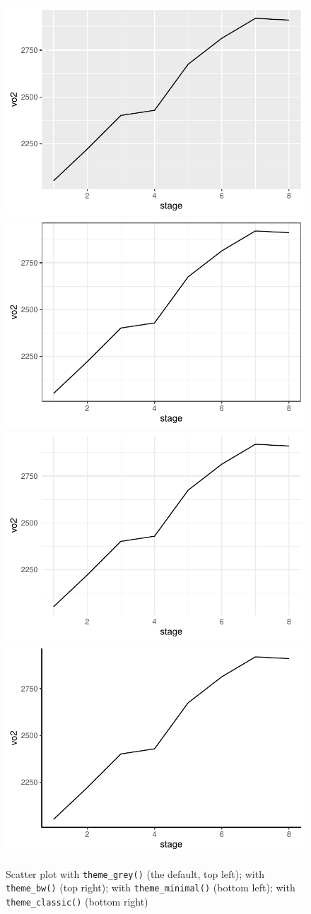 \documentclass[
]{book}
\begin{document}
\begin{figure}

{\centering \includegraphics[width=0.5\linewidth]{se201_stats_book_files/figure-latex/FIG-APPEARANCE-THEME-1} \includegraphics[width=0.5\linewidth]{se201_stats_book_files/figure-latex/FIG-APPEARANCE-THEME-2} \includegraphics[width=0.5\linewidth]{se201_stats_book_files/figure-latex/FIG-APPEARANCE-THEME-3} \includegraphics[width=0.5\linewidth]{se201_stats_book_files/figure-latex/FIG-APPEARANCE-THEME-4} 

}

\caption[Scatter plot with \texttt{theme\_grey()} (the default, top left); with \texttt{theme\_bw()} (top right); with \texttt{theme\_minimal()} (bottom left); with \texttt{theme\_classic()} (bottom right)]{Scatter plot with \texttt{theme\_grey()} (the default, top left); with \texttt{theme\_bw()} (top right); with \texttt{theme\_minimal()} (bottom left); with \texttt{theme\_classic()} (bottom right)}\label{fig:FIG-APPEARANCE-THEME}
\end{figure}
\end{document}
